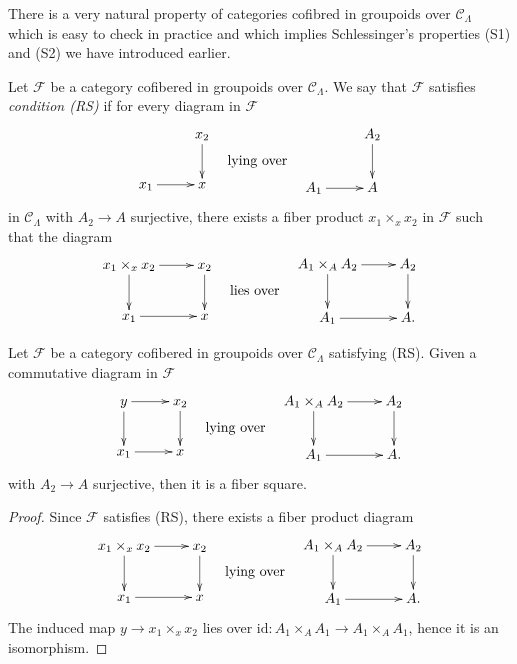 \noindent
There is a very natural property of categories cofibred in groupoids
over $\mathcal{C}_\Lambda$ which is easy to check in practice
and which implies Schlessinger's properties (S1) and (S2) we
have introduced earlier.

\begin{definition}
\label{definition-RS}
Let $\mathcal{F}$ be a category cofibered in groupoids over $\mathcal
C_\Lambda$.  We say that $\mathcal{F}$ satisfies {\it condition (RS)}
if for every diagram in $\mathcal{F}$
$$
\vcenter{
\xymatrix{
           & x_2 \ar[d] \\
x_1 \ar[r] & x
}
}
\quad\text{lying over}\quad
\vcenter{
\xymatrix{
           & A_2 \ar[d] \\
A_1 \ar[r] & A
}
}
$$
in $\mathcal{C}_\Lambda$ with $A_2 \to A$ surjective, there exists a
fiber product $x_1 \times_x x_2$ in $\mathcal{F}$ such that the diagram
$$
\vcenter{
\xymatrix{
x_1 \times_x x_2 \ar[r] \ar[d] & x_2 \ar[d] \\
x_1 \ar[r]      & x
}
}
\quad\text{lies over}\quad
\vcenter{
\xymatrix{
A_1 \times_A A_2 \ar[r] \ar[d] & A_2 \ar[d] \\
A_1 \ar[r]      & A.
}
}
$$
\end{definition}

\begin{lemma}
\label{lemma-RS-fiber-square}
Let $\mathcal{F}$ be a category cofibered in groupoids over
$\mathcal{C}_\Lambda$ satisfying (RS). Given a commutative diagram
in $\mathcal{F}$
$$
\vcenter{
\xymatrix{
y \ar[r] \ar[d] & x_2 \ar[d]   \\
x_1 \ar[r]      & x
}
}
\quad\text{lying over}\quad
\vcenter{
\xymatrix{
A_1 \times_A A_2 \ar[r] \ar[d] & A_2 \ar[d] \\
A_1 \ar[r]      & A.
}
}
$$
with $A_2 \to A$ surjective, then it is a fiber square.
\end{lemma}

\begin{proof}
Since $\mathcal{F}$ satisfies (RS), there exists a fiber product diagram
$$
\vcenter{
\xymatrix{
x_1 \times_x x_2 \ar[r] \ar[d] & x_2 \ar[d] \\
x_1 \ar[r]      & x
}
}
\quad\text{lying over}\quad
\vcenter{
\xymatrix{
A_1 \times_A A_2 \ar[r] \ar[d] & A_2 \ar[d] \\
A_1 \ar[r]      & A.
}
}
$$
The induced map $y \to x_1 \times_x x_2$ lies over
$\text{id} : A_1 \times_A A_1 \to A_1 \times_A A_1$, hence it is an
isomorphism.
\end{proof}


